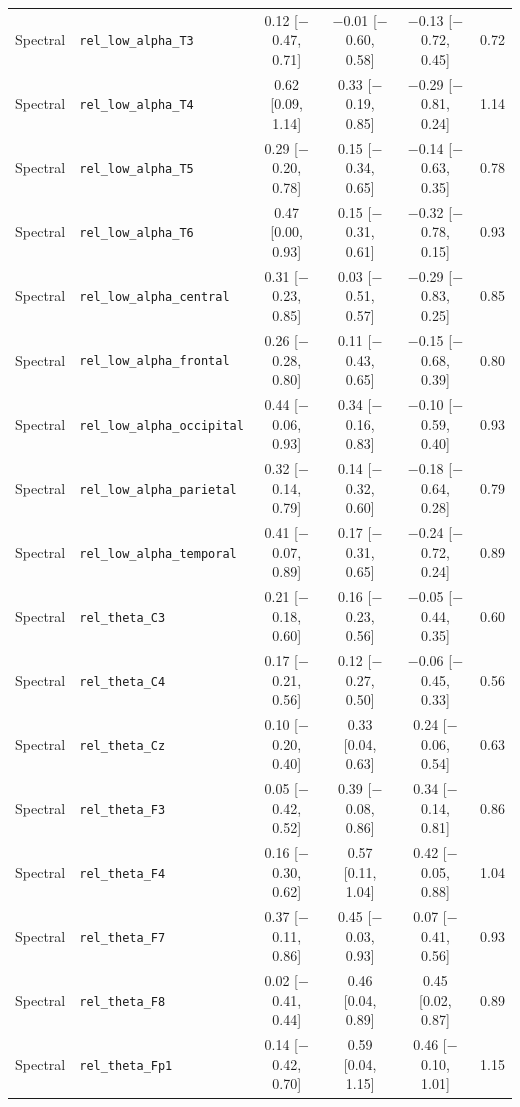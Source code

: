 {\begin{longtable}{llcccc}
Spectral & \texttt{rel\_low\_alpha\_T3} & 0.12 [$-$0.47, 0.71] & $-$0.01 [$-$0.60, 0.58] & $-$0.13 [$-$0.72, 0.45] & 0.72 \\
Spectral & \texttt{rel\_low\_alpha\_T4} & 0.62 [0.09, 1.14] & 0.33 [$-$0.19, 0.85] & $-$0.29 [$-$0.81, 0.24] & 1.14 \\
Spectral & \texttt{rel\_low\_alpha\_T5} & 0.29 [$-$0.20, 0.78] & 0.15 [$-$0.34, 0.65] & $-$0.14 [$-$0.63, 0.35] & 0.78 \\
Spectral & \texttt{rel\_low\_alpha\_T6} & 0.47 [0.00, 0.93] & 0.15 [$-$0.31, 0.61] & $-$0.32 [$-$0.78, 0.15] & 0.93 \\
Spectral & \texttt{rel\_low\_alpha\_central} & 0.31 [$-$0.23, 0.85] & 0.03 [$-$0.51, 0.57] & $-$0.29 [$-$0.83, 0.25] & 0.85 \\
Spectral & \texttt{rel\_low\_alpha\_frontal} & 0.26 [$-$0.28, 0.80] & 0.11 [$-$0.43, 0.65] & $-$0.15 [$-$0.68, 0.39] & 0.80 \\
Spectral & \texttt{rel\_low\_alpha\_occipital} & 0.44 [$-$0.06, 0.93] & 0.34 [$-$0.16, 0.83] & $-$0.10 [$-$0.59, 0.40] & 0.93 \\
Spectral & \texttt{rel\_low\_alpha\_parietal} & 0.32 [$-$0.14, 0.79] & 0.14 [$-$0.32, 0.60] & $-$0.18 [$-$0.64, 0.28] & 0.79 \\
Spectral & \texttt{rel\_low\_alpha\_temporal} & 0.41 [$-$0.07, 0.89] & 0.17 [$-$0.31, 0.65] & $-$0.24 [$-$0.72, 0.24] & 0.89 \\
Spectral & \texttt{rel\_theta\_C3} & 0.21 [$-$0.18, 0.60] & 0.16 [$-$0.23, 0.56] & $-$0.05 [$-$0.44, 0.35] & 0.60 \\
Spectral & \texttt{rel\_theta\_C4} & 0.17 [$-$0.21, 0.56] & 0.12 [$-$0.27, 0.50] & $-$0.06 [$-$0.45, 0.33] & 0.56 \\
Spectral & \texttt{rel\_theta\_Cz} & 0.10 [$-$0.20, 0.40] & 0.33 [0.04, 0.63] & 0.24 [$-$0.06, 0.54] & 0.63 \\
Spectral & \texttt{rel\_theta\_F3} & 0.05 [$-$0.42, 0.52] & 0.39 [$-$0.08, 0.86] & 0.34 [$-$0.14, 0.81] & 0.86 \\
Spectral & \texttt{rel\_theta\_F4} & 0.16 [$-$0.30, 0.62] & 0.57 [0.11, 1.04] & 0.42 [$-$0.05, 0.88] & 1.04 \\
Spectral & \texttt{rel\_theta\_F7} & 0.37 [$-$0.11, 0.86] & 0.45 [$-$0.03, 0.93] & 0.07 [$-$0.41, 0.56] & 0.93 \\
Spectral & \texttt{rel\_theta\_F8} & 0.02 [$-$0.41, 0.44] & 0.46 [0.04, 0.89] & 0.45 [0.02, 0.87] & 0.89 \\
Spectral & \texttt{rel\_theta\_Fp1} & 0.14 [$-$0.42, 0.70] & 0.59 [0.04, 1.15] & 0.46 [$-$0.10, 1.01] & 1.15 \\

\end{longtable}}
